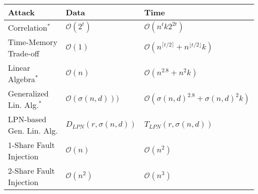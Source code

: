 {
\renewcommand{\arraystretch}{1.3}
\setlength{\tabcolsep}{10pt}
\newcommand{\numnodes}{n}
\newcommand{\matexp}{{2.8}}
\newcommand\numshares{t}
\newcommand\numpred{k}
\newcommand\cororder{t}
\newcommand\sumbinom[2]{\sigma(#1,#2)}
\newcommand\winsize{n}
\newcommand\OO{\mathcal{O}}

\newcommand\com[1]{{\scriptsize #1}}
\newcommand\attknown{$\text{}^*$}
\begin{table}
    \label{tab:attacks}
    \begin{center}
    \begin{tabular}{@{} l l l @{}}
        Attack & Data & Time \\
        \midrule
            Correlation\attknown{} &
            $\OO(2^{\cororder})$ &
            $\OO(\numnodes^{\cororder} \numpred 2^{2\cororder})$
            \\
            
            Time-Memory Trade-off &
            $\OO(1)$ &
            $\OO(\numnodes^{\lceil \numshares/2 \rceil} + \numnodes^{\lfloor \numshares/2 \rfloor} \numpred)$ 
            \\
            
            Linear Algebra\attknown{} &
            $\OO(\numnodes)$ &
            $\OO(\numnodes^\matexp + \numnodes^2\numpred)$ %
            \\
        
            Generalized Lin. Alg.\attknown{}&
            $\OO(\sumbinom{\numnodes}{d}))$ &
            $\OO(\sumbinom{\numnodes}{d}^\matexp + \sumbinom{\numnodes}{d}^2\numpred)$ 
            \\
            
            LPN-based Gen. Lin. Alg. &
            $D_{LPN}(r,\sumbinom{\winsize}{d})$ &
            $T_{LPN}(r,\sumbinom{\winsize}{d})$
            \\

            1-Share Fault Injection &
            $\OO(\numnodes)$ &
            $\OO(\numnodes^2)$
            \\
            
            2-Share Fault Injection &
            $\OO(\numnodes^2)$ &
            $\OO(\numnodes^3)$
    \end{tabular}
    \end{center}
    

\end{table}}
